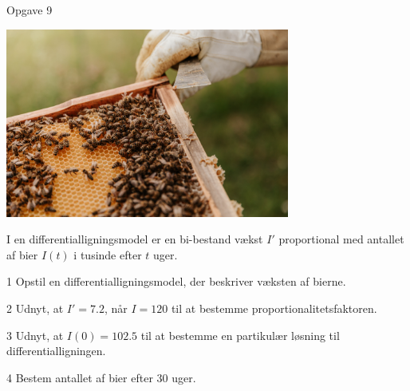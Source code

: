 \begin{opgavetekst}{Opgave 9}
	\begin{center}
		\includegraphics[width=0.7\textwidth]{Billeder/bees.jpg}
	\end{center}
	I en differentialligningsmodel er en bi-bestand vækst $I'$ proportional med antallet af bier $I(t)$ i tusinde efter $t$ uger.
\end{opgavetekst}
\begin{delopgave}{}{1}
	Opstil en differentialligningsmodel, der beskriver væksten af bierne.
\end{delopgave}
\begin{delopgave}{}{2}
	Udnyt, at $I' = 7.2$, når $I = 120$ til at bestemme proportionalitetsfaktoren. 
\end{delopgave}
\begin{delopgave}{}{3}
	Udnyt, at $I(0) = 102.5$ til at bestemme en partikulær løsning til differentialligningen.
\end{delopgave}
\begin{delopgave}{}{4}
	Bestem antallet af bier efter 30 uger. 
\end{delopgave}